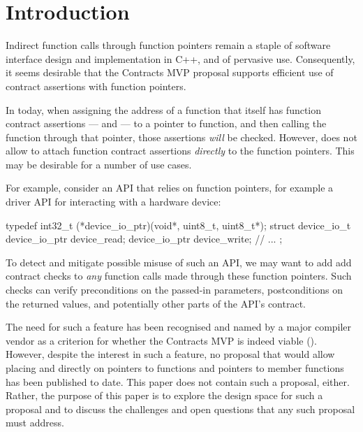 
\tableofcontents*
\pagebreak





\section{Introduction}
\label{intro}

Indirect function calls through function pointers remain a staple of software interface design and implementation in C++, and of pervasive use. Consequently, it seems desirable that the Contracts MVP proposal \cite{P2900R9} supports efficient use of contract assertions with function pointers. 

In \cite{P2900R9} today, when assigning the address of a function that itself has function contract assertions ---  and  --- to a pointer to function, and then calling the function through that pointer, those assertions \emph{will} be checked. However, \cite{P2900R9} does not allow to attach function contract assertions \emph{directly} to the function pointers. This may be desirable for a number of use cases.

For example, consider an API that relies on function pointers, for example a driver API for interacting with a hardware device:
\begin{codeblock}
typedef int32_t (*device_io_ptr)(void*, uint8_t, uint8_t*);
struct device_io_t {
  device_io_ptr device_read;
  device_io_ptr device_write;
  // ...
};
\end{codeblock}
To detect and mitigate possible misuse of such an API, we may want to add add contract checks to \emph{any} function calls made through these function pointers. Such checks can verify preconditions on the passed-in parameters, postconditions on the returned values, and potentially other parts of the API's contract.

The need for such a feature has been recognised and named by a major compiler vendor as a criterion for whether the Contracts MVP is indeed viable (\cite{P3173R0}). However, despite the interest in such a feature, no proposal that would allow placing  and  directly on pointers to functions and pointers to member functions has been published to date. This paper does not contain such a proposal, either. Rather, the purpose of this paper is to explore the design space for such a proposal and to discuss the challenges and open questions that any such proposal must address.

